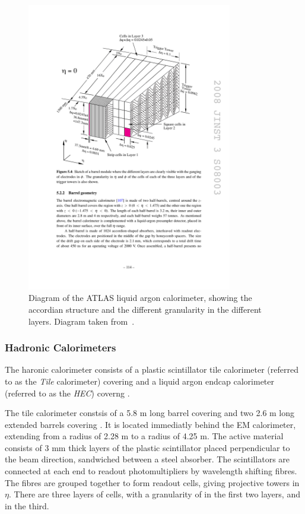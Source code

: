 \begin{figure}[h]
\centering
\includegraphics[width=0.8\textwidth]{lar-diagram}
\caption{Diagram of the ATLAS liquid argon calorimeter, showing the accordian
structure and the different granularity in the different layers. Diagram taken
from~\cite{1748-0221-3-08-S08003}.}
\label{fig:lar-diagram}
\end{figure}

\subsubsection{Hadronic Calorimeters}

The haronic calorimeter consists of a plastic scintillator tile calorimeter 
(referred to as the {\it Tile} calorimeter) covering  and a liquid
argon endcap calorimeter (referred to as the {\it HEC}) coverng
. 

The tile calorimeter constsis of a 5.8 m long barrel covering
 and two 2.6 m long extended barrels covering
.
It is located immediatly behind the EM calorimeter, extending from a radius of
2.28 m to a radius of 4.25 m. The active material consists of 3 mm thick layers of the plastic scintillator 
placed perpendicular to the beam direction, sandwiched between a steel absorber.
The scintillators are connected at each end to
readout photomultipliers by wavelength shifting fibres. The fibres are grouped
together to form readout cells, giving projective towers in $\eta$. There are
three layers of cells, with a granularity of  in the
first two layers, and  in the third.

